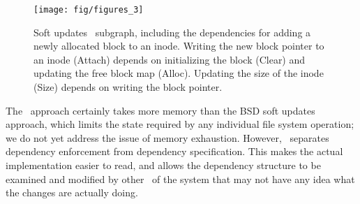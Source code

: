 \begin{figure}[htb]
  \centering
  \texttt{[image: fig/figures\_3]}
  \caption{\label{fig:softupdate} Soft updates \chdesc\ subgraph,
  including the dependencies for adding a newly allocated block to an
  inode. Writing the new block pointer to an inode (Attach) depends on
  initializing the block (Clear) and updating the free block map (Alloc).
  Updating the size of the inode (Size) depends on writing the block
  pointer.}
\end{figure}


The \Kudos\ approach certainly takes more memory than the BSD soft updates approach,
which limits the state required by any individual file system operation; we do
not yet address the issue of memory exhaustion.
%
However, \Kudos\ separates dependency enforcement from dependency
specification. This makes the actual implementation easier to read, and allows
the dependency structure to be examined and modified by other \modules\ of the
system that may not have any idea what the changes are actually doing.
